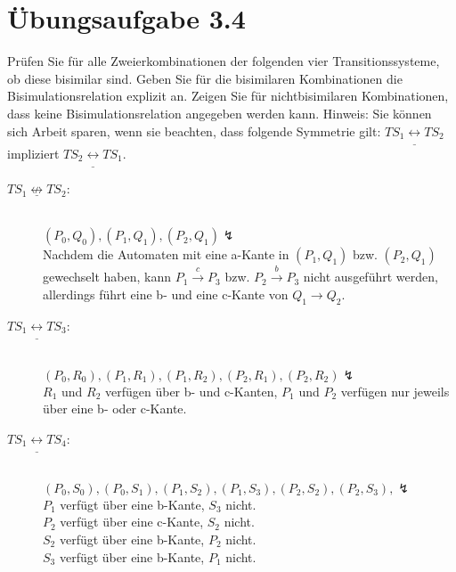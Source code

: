 \documentclass[a4paper]{scrartcl}
\begin{document}
\section*{Übungsaufgabe 3.4}
Prüfen Sie für alle Zweierkombinationen der folgenden vier Transitionssysteme, ob 
diese bisimilar sind. Geben Sie für die bisimilaren Kombinationen die 
Bisimulationsrelation explizit an. Zeigen Sie für nichtbisimilaren Kombinationen, 
dass keine Bisimulationsrelation angegeben werden kann. Hinweis: Sie können sich 
Arbeit sparen, wenn sie beachten, dass folgende Symmetrie gilt: 
$TS_1 \underline{\leftrightarrow} TS_2$ impliziert $TS_2 \underline{\leftrightarrow} TS_1$.
\begin{description}
    \item[$TS_1 \underline{\not\leftrightarrow} TS_2$:] \hfill\\ 
        $(P_0, Q_0), (P_1, Q_1), (P_2, Q_1) \lightning$ \\
        Nachdem die Automaten mit eine a-Kante in $(P_1, Q_1)$ bzw. $(P_2, Q_1)$ 
        gewechselt haben, kann $P_1 \stackrel{c}{\rightarrow} P_3$ bzw. $P_2 \stackrel{b}{\rightarrow} P_3$
        nicht ausgeführt werden, allerdings führt eine b- und eine c-Kante von 
        $Q_1 \rightarrow Q_2$.
    \item[$TS_1 \underline{\leftrightarrow} TS_3$:] \hfill\\
        $(P_0, R_0), (P_1, R_1), (P_1, R_2), (P_2, R_1), (P_2, R_2) \lightning$ \\
        $R_1$ und $R_2$ verfügen über b- und c-Kanten, $P_1$ und $P_2$ verfügen
        nur jeweils über eine b- oder c-Kante.
    \item[$TS_1 \underline{\leftrightarrow} TS_4$:] \hfill\\
        $(P_0, S_0), (P_0, S_1), (P_1, S_2), (P_1, S_3), (P_2, S_2), (P_2, S_3), \lightning$ \\
        $P_1$ verfügt über eine b-Kante, $S_3$ nicht. \\
        $P_2$ verfügt über eine c-Kante, $S_2$ nicht. \\
        $S_2$ verfügt über eine b-Kante, $P_2$ nicht. \\
        $S_3$ verfügt über eine b-Kante, $P_1$ nicht. \\
\end{description}
\end{document}
